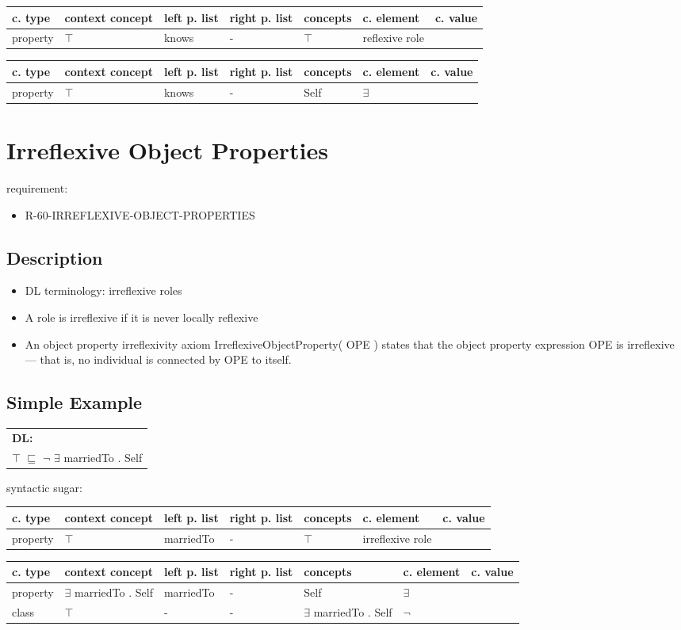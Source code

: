 \documentclass{llncs}
\newenvironment{gcotable}{
  \scriptsize
  \sffamily
  \vspace{0.3cm}
  \begin{tabular}{l|l|l|l|l|l|l}
  \hline
  \textbf{c. type} & \textbf{context concept} & \textbf{left p. list} & \textbf{right p. list} & \textbf{concepts} & \textbf{c. element} & \textbf{c. value} \\
  \hline

}{
  \hline
  \end{tabular}
  \linebreak
}
\newenvironment{DL}{
  \scriptsize
  \sffamily
  \vspace{0.3cm}
  \begin{tabular}{l}
	\textbf{DL:} \\

}{
  \end{tabular}
  \linebreak
}
\begin{document}
\begin{gcotable}
property & $\top$ & knows & - & $\top$ & reflexive role \\
\end{gcotable}

\begin{gcotable}
property & $\top$ & knows & - & Self & $\exists$ \\
\end{gcotable}

\section{Irreflexive Object Properties}

requirement:

\begin{itemize}
	\item R-60-IRREFLEXIVE-OBJECT-PROPERTIES
\end{itemize}

\subsection{Description}

\begin{itemize}
	\item DL terminology: irreflexive roles
  \item A role is irreflexive if it is never locally reflexive \cite{Kroetzsch2012}
	\item An object property irreflexivity axiom IrreflexiveObjectProperty( OPE ) states that the object property expression OPE is irreflexive — that is, no individual is connected by OPE to itself. 
\end{itemize}

\subsection{Simple Example}

\begin{DL}
$\top$ $\sqsubseteq$ $\neg$ $\exists$ marriedTo . Self
\end{DL}

syntactic sugar:

\begin{gcotable}
property & $\top$ & marriedTo & - & $\top$ & irreflexive role \\
\end{gcotable}

\begin{gcotable}
property & $\exists$ marriedTo . Self & marriedTo & - & Self & $\exists$ \\
class & $\top$ & - & - & $\exists$ marriedTo . Self & $\neg$ \\
\end{gcotable}
\end{document}
